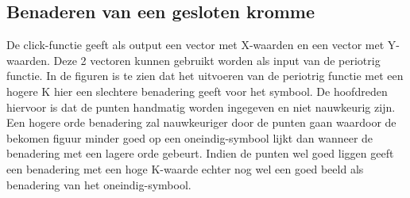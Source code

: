 \documentclass[a4paper, 12pt, titlepage]{report}
\begin{document}
\subsection{Benaderen van een gesloten kromme}
De click-functie geeft als output een vector met X-waarden en een vector met Y-waarden. Deze 2 vectoren kunnen gebruikt worden als input van de periotrig functie. In de figuren is te zien dat het uitvoeren van de periotrig functie met een hogere K hier een slechtere benadering geeft voor het symbool. De hoofdreden hiervoor is dat de punten handmatig worden ingegeven en niet nauwkeurig zijn. Een hogere orde benadering zal nauwkeuriger door de punten gaan waardoor de bekomen figuur minder goed op een oneindig-symbool lijkt dan wanneer de benadering met een lagere orde gebeurt. Indien de punten wel goed liggen geeft een benadering met een hoge K-waarde echter nog wel een goed beeld als benadering van het oneindig-symbool.
\end{document}
